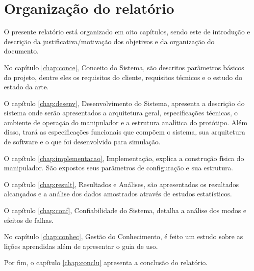 \section{Organização do relatório}
\label{sec:org}
O presente relatório está organizado em oito capítulos, sendo este de introdução e descrição da justificativa/motivação dos objetivos e da organização do documento.

No capítulo \ref{chap:conce}, Conceito do Sistema, são descritos  parâmetros básicos do projeto, dentre eles os requisitos do cliente, requisitos técnicos e o estudo do estado da arte.

O capítulo \ref{chap:desenv}, Desenvolvimento do Sistema, apresenta a descrição do sistema onde serão apresentados a arquitetura geral, especificações técnicas, o ambiente de operação do manipulador e a estrutura analítica do protótipo. Além disso, trará as especificações funcionais que compõem o sistema, sua arquitetura de software e o que foi desenvolvido para simulação. 

O capítulo \ref{chap:implementacao}, Implementação, explica a construção física do manipulador. São expostos seus parâmetros de configuração e sua estrutura. 

O capítulo \ref{chap:result}, Resultados e Análises, são apresentados os resultados alcançados e a análise dos dados amostrados através de estudos estatísticos. 

O capítulo \ref{chap:conf}, Confiabilidade do Sistema, detalha a análise dos modos e efeitos de falhas.

No capítulo \ref{chap:conhec}, Gestão do Conhecimento, é feito um estudo sobre as lições aprendidas além de apresentar o guia de uso.

Por fim, o capítulo \ref{chap:conclu} apresenta a conclusão do relatório.


